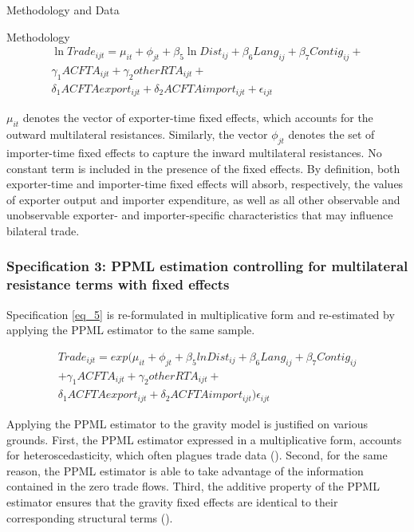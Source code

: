 \begin{section}{Methodology and Data }
\begin{subsection}{Methodology }
\begin{multline}\label{eq_5}
\ln{Trade_{ijt}} = \mu_{it} + \phi_{jt} + \beta_5 \ln{Dist_{ij}} + \beta_6 Lang_{ij} + \beta_7 Contig_{ij} + \\ \gamma_1 ACFTA_{ijt} + \gamma_2 otherRTA_{ijt} + \\
\delta_1 ACFTAexport_{ijt} + \delta_2 ACFTAimport_{ijt} + \epsilon_{ijt}
\end{multline}

$\mu_{it}$ denotes the vector of exporter-time fixed effects, which accounts for the outward multilateral resistances. Similarly, the vector $\phi_{jt}$ denotes the set of importer-time fixed effects to capture the inward multilateral resistances. No constant term is included in the presence of the fixed effects. By definition, both exporter-time and importer-time fixed effects will absorb, respectively, the values of exporter output and importer expenditure, as well as all other observable and unobservable exporter- and importer-specific characteristics that may influence bilateral trade.


\subsubsection*{Specification 3: PPML estimation controlling for multilateral resistance terms with fixed effects}

Specification \ref{eq_5} is re-formulated in multiplicative form and re-estimated by applying the PPML estimator to the same sample.

\begin{multline}\label{eq_6}
Trade_{ijt} = exp \Big(\mu_{it} + \phi_{jt} + \beta_5 lnDist_{ij} + \beta_6 Lang_{ij} + \beta_7 Contig_{ij} \\ 
+ \gamma_1 ACFTA_{ijt} + \gamma_2 otherRTA_{ijt} + \\
\delta_1 ACFTAexport_{ijt} + \delta_2 ACFTAimport_{ijt}\Big) \epsilon_{ijt}
\end{multline}

\bigskip
Applying the PPML estimator to the gravity model is justified on various grounds. First, the PPML estimator expressed in a multiplicative form, accounts for heteroscedasticity, which often plagues trade data (\cite{silva2006log}). Second, for the same reason, the PPML estimator is able to take advantage of the information contained in the zero trade flows. Third, the additive property of the PPML estimator ensures that the gravity fixed effects are identical to their corresponding structural terms (\cite{fally2015}).


\end{subsection}
\end{section}
